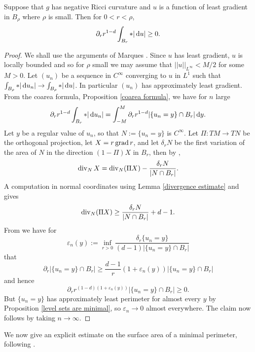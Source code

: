 \begin{proposition}\label{Monotonicity Formula}
Suppose that $g$ has negative Ricci curvature and $u$ is a function of least gradient in $B_\rho$ where $\rho$ is small. Then for $0 < r < \rho$,
$$\partial_r r^{1 - d} \int_{B_r} *|\mathop{}\!\mathrm{d} u| \geq 0.$$
\end{proposition}
\begin{proof}
We shall use the arguments of Marques \cite[Theorem 7.11]{MarquesXX}.
Since $u$ has least gradient, $u$ is locally bounded and so for $\rho$ small we may assume that $||u||_{L^\infty} < M/2$ for some $M > 0$.
Let $(u_n)$ be a sequence in $C^\infty$ converging to $u$ in $L^1$ such that $\int_{B_\rho} *|\mathop{}\!\mathrm{d} u_n| \to \int_{B_\rho} *|\mathop{}\!\mathrm{d} u|$.
In particular $(u_n)$ has approximately least gradient.
From the coarea formula, Proposition \ref{coarea formula}, we have for $n$ large
$$\partial_r r^{1 - d} \int_{B_r} *|\mathop{}\!\mathrm{d} u_n| = \int_{-M}^M \partial_r r^{1 - d} |\{u_n = y\} \cap B_r| \mathop{}\!\mathrm{d} y.$$
Let $y$ be a regular value of $u_n$, so that $N := \{u_n = y\}$ is $C^\infty$.
Let $\Pi: TM \to TN$ be the orthogonal projection, let $X = r\operatorname{grad} r$, and let $\delta_r N$ be the first variation of the area of $N$ in the direction $(1 - \Pi)X$ in $B_r$, then by \cite[Lemma 2.4, pg12]{MarquesXX},
$$\operatorname{div}_N X = \operatorname{div}_N(\Pi X) - \frac{\delta_r N}{|N \cap B_r|}.$$
A computation in normal coordinates using Lemma \ref{divergence estimate} and \cite[Proposition 7.4]{MarquesXX} gives
$$\operatorname{div}_N(\Pi X) \geq \frac{\delta_r N}{|N \cap B_r|} + d - 1.$$
From \cite[pg16]{MarquesXX} we have for
$$\varepsilon_n(y) := \inf_{r > 0} \frac{\delta_r \{u_n = y\}}{(d - 1)|\{u_n = y\} \cap B_r|}$$
that
$$\partial_r |\{u_n = y\} \cap B_r| \geq \frac{d - 1}{r} (1 + \varepsilon_n(y)) |\{u_n = y\} \cap B_r|$$
and hence
$$\partial_r r^{(1 - d)(1 + \varepsilon_n(y))} |\{u_n = y\} \cap B_r| \geq 0.$$
But $\{u_n = y\}$ has approximately least perimeter for almost every $y$ by Proposition \ref{level sets are minimal}, so $\varepsilon_n \to 0$ almost everywhere.
The claim now follows by taking $n \to \infty$.
\end{proof}

We now give an explicit estimate on the surface area of a minimal perimeter, following \cite[pg74]{Giusti77}.

